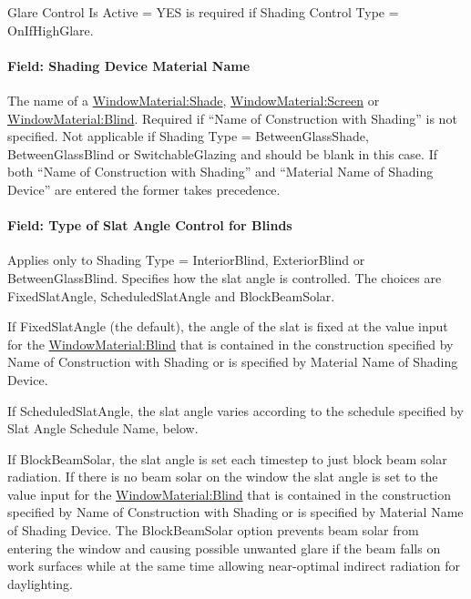 Glare Control Is Active = YES is required if Shading Control Type = OnIfHighGlare.

\paragraph{Field: Shading Device Material Name}\label{field-shading-device-material-name}

The name of a \hyperref[windowmaterialshade]{WindowMaterial:Shade}, \hyperref[windowmaterialscreen]{WindowMaterial:Screen} or \hyperref[windowmaterialblind]{WindowMaterial:Blind}. Required if ``Name of Construction with Shading'' is not specified. Not applicable if Shading Type = BetweenGlassShade, BetweenGlassBlind or SwitchableGlazing and should be blank in this case. If both ``Name of Construction with Shading'' and ``Material Name of Shading Device'' are entered the former takes precedence.

\paragraph{Field: Type of Slat Angle Control for Blinds}\label{field-type-of-slat-angle-control-for-blinds}

Applies only to Shading Type = InteriorBlind, ExteriorBlind or BetweenGlassBlind. Specifies how the slat angle is controlled. The choices are FixedSlatAngle, ScheduledSlatAngle and BlockBeamSolar.

If FixedSlatAngle (the default), the angle of the slat is fixed at the value input for the \hyperref[windowmaterialblind]{WindowMaterial:Blind} that is contained in the construction specified by Name of Construction with Shading or is specified by Material Name of Shading Device.

If ScheduledSlatAngle, the slat angle varies according to the schedule specified by Slat Angle Schedule Name, below.

If BlockBeamSolar, the slat angle is set each timestep to just block beam solar radiation. If there is no beam solar on the window the slat angle is set to the value input for the \hyperref[windowmaterialblind]{WindowMaterial:Blind} that is contained in the construction specified by Name of Construction with Shading or is specified by Material Name of Shading Device. The BlockBeamSolar option prevents beam solar from entering the window and causing possible unwanted glare if the beam falls on work surfaces while at the same time allowing near-optimal indirect radiation for daylighting.

